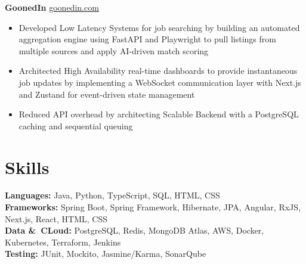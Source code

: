 \documentclass[11pt]{article}       %
\begin{document}
\textbf{GoonedIn} \hfill \href{https://goonedin.vercel.app/}{goonedin.com} \\
\vspace{-9pt}
\begin{itemize}
  \item Developed Low Latency Systems for job searching by building an automated aggregation engine using FastAPI and Playwright to pull listings from multiple sources and apply AI-driven match scoring
  \item Architected High Availability real-time dashboards to provide instantaneous job updates by implementing a WebSocket communication layer with Next.js and Zustand for event-driven state management
  \item Reduced API overhead by architecting Scalable Backend with a PostgreSQL caching and sequential queuing
\end{itemize}


\vspace{-18.5pt}

\section*{Skills}
\textbf{Languages:} Java, Python, TypeScript, SQL, HTML, CSS \\
\textbf{Frameworks:} Spring Boot, Spring Framework, Hibernate, JPA, Angular, RxJS, Next.js, React, HTML, CSS \\   
\textbf{Data \&\ CLoud:} PostgreSQL, Redis, MongoDB Atlas, AWS, Docker, Kubernetes, Terraform, Jenkins\\
\textbf{Testing:} JUnit, Mockito, Jasmine/Karma, SonarQube
\end{document}
